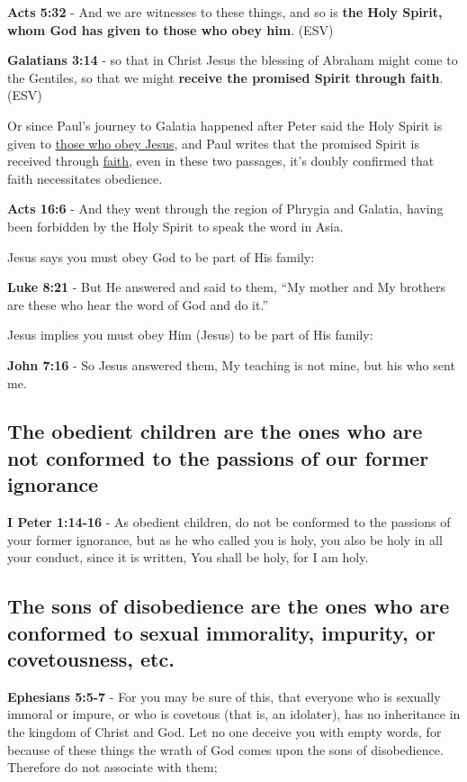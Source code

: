 \documentclass[11pt]{article}
\begin{document}
\textbf{Acts 5:32} - And we are witnesses to these things, and so is \textbf{the Holy Spirit, whom God has given to those who obey him}. (ESV)

\textbf{Galatians 3:14} - so that in Christ Jesus the blessing of Abraham might come to the Gentiles, so that we might \textbf{receive the promised Spirit through faith}. (ESV)

Or since Paul's journey to Galatia happened after Peter said the Holy Spirit is given to \uline{those who obey Jesus}, and Paul writes that the promised Spirit is received through \uline{faith}, even in these two passages, it's doubly confirmed that faith necessitates obedience.

\textbf{Acts 16:6} - And they went through the region of Phrygia and Galatia, having been forbidden by the Holy Spirit to speak the word in Asia.

Jesus says you must obey God to be part of His family:

\textbf{Luke 8:21} - But He answered and said to them, “My mother and My brothers are these who hear the word of God and do it.”

Jesus implies you must obey Him (Jesus) to be part of His family:

\textbf{John 7:16} - So Jesus answered them, My teaching is not mine, but his who sent me.

\subsection{The obedient children are the ones who are not conformed to the passions of our former ignorance}
\label{sec:org2f8b4db}
\textbf{I Peter 1:14-16} - As obedient children, do not be conformed to the passions of your former ignorance, but as he who called you is holy, you also be holy in all your conduct, since it is written, You shall be holy, for I am holy.

\subsection{The sons of disobedience are the ones who are conformed to sexual immorality, impurity, or covetousness, etc.}
\label{sec:orgf9474fe}
\textbf{Ephesians 5:5-7} - For you may be sure of this, that everyone who is sexually immoral or impure, or who is covetous (that is, an idolater), has no inheritance in the kingdom of Christ and God. Let no one deceive you with empty words, for because of these things the wrath of God comes upon the sons of disobedience. Therefore do not associate with them;
\end{document}
